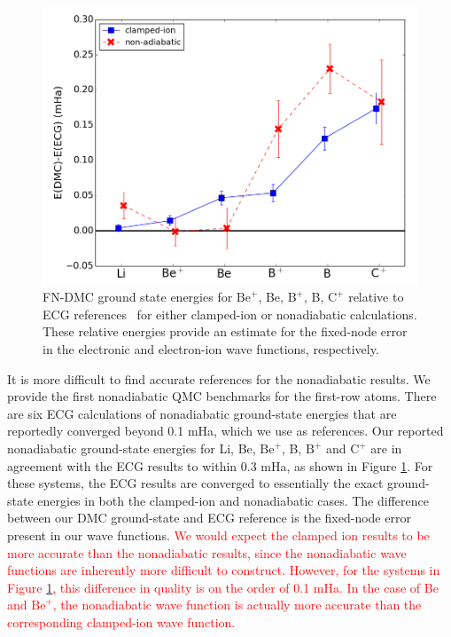 \documentclass[aip,jcp,numerical,reprint]{revtex4-1}
\begin{document}
\begin{figure}[h]
\centering
\includegraphics[scale=.4]{atom-ECG}
\caption{FN-DMC ground state energies for $\text{Be}^+$, Be, $\text{B}^+$, B, $\text{C}^+$ relative to ECG references~\cite{Stanke_Be,Puchalski_Be+,Bubin_BeH_noBO,Bubin_B,Bubin_B+,Bubin_C+} for either clamped-ion or nonadiabatic calculations. These relative energies provide an estimate for the fixed-node error in the electronic and electron-ion wave functions, respectively.\label{fig:atom-ECG}}
\end{figure}

It is more difficult to find accurate references for the nonadiabatic results. We provide the first nonadiabatic QMC benchmarks for the first-row atoms. There are six ECG calculations of nonadiabatic ground-state energies that are reportedly converged beyond 0.1 mHa, which we use as references. Our reported nonadiabatic ground-state energies for Li, Be, $\text{Be}^+$, B, $\text{B}^+$ and $\text{C}^+$ are in agreement with the ECG results to within 0.3 mHa, as shown in Figure \ref{fig:atom-ECG}. For these systems, the ECG results are converged to essentially the exact ground-state energies in both the clamped-ion and nonadiabatic cases. The difference between our DMC ground-state and ECG reference is the fixed-node error present in our wave functions. \textcolor{red}{We would expect the clamped ion results to be more accurate than the nonadiabatic results, since the nonadiabatic wave functions are inherently more difficult to construct.  However, for the systems in Figure \ref{fig:atom-ECG}, this difference in quality is on the order of 0.1 mHa. In the case of Be and $\text{Be}^+$, the nonadiabatic wave function is actually more accurate than the corresponding clamped-ion wave function.}
\end{document}
